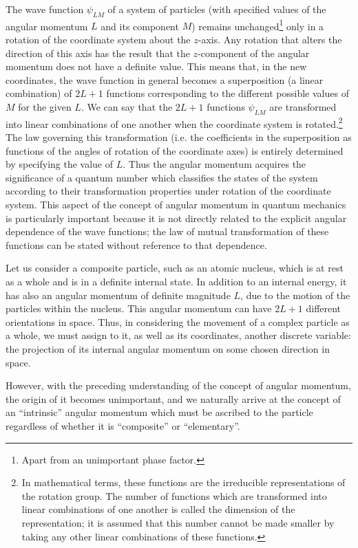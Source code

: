 The wave function $\psi_{LM}$ of a system of particles (with specified values of the angular momentum $ L $ and its component $ M $) remains unchanged\footnote{Apart from an unimportant phase factor.
} only in a rotation of the coordinate system about the $ z $-axis. Any rotation that alters the direction of this axis has the result that the $ z $-component of the angular momentum does not have a definite value. This means that, in the new coordinates, the wave function in general becomes a superposition (a linear combination) of $ 2L + 1 $ functions corresponding to the different possible values of $ M $ for the given $ L $. We can say that the $ 2L + 1 $ functions $\psi_{LM}$ are transformed into linear combinations of one another when the coordinate system is rotated.\footnote{In mathematical terms, these functions are the irreducible representations of the rotation group. The number of functions which are transformed into linear combinations of one another is called the dimension of the representation; it is assumed that this number cannot be made smaller by taking any other linear combinations of these functions.
} The law governing this transformation (i.e. the coefficients in the superposition as functions of the angles of rotation of the coordinate axes) is entirely determined by specifying the value of $ L $. Thus the angular momentum acquires the significance of a quantum number which classifies the states of the system according to their transformation properties under rotation of the coordinate system. This aspect of the concept of angular momentum in quantum mechanics is particularly important because it is not directly related to the explicit angular dependence of the wave functions; the law of mutual transformation of these functions can be stated without reference to that dependence.

Let us consider a composite particle, such as an atomic nucleus, which is at rest as a whole and is in a definite internal state. In addition to an internal energy, it has also an angular momentum of definite magnitude $ L $, due to the motion of the particles within the nucleus. This angular momentum can have $ 2L + 1 $ different orientations in space. Thus, in considering the movement of a complex particle as a whole, we must assign to it, as well as its coordinates, another discrete variable: the projection of its internal angular momentum on some chosen direction in space.

However, with the preceding understanding of the concept of angular momentum, the origin of it becomes unimportant, and we naturally arrive at the concept of an “intrinsic” angular momentum which must be ascribed to the particle regardless of whether it is “composite” or “elementary”.

